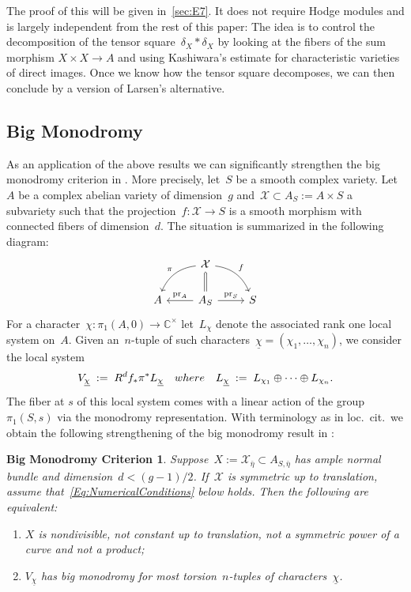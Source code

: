 \documentclass[a4paper]{amsart}
\newcommand{\bbC}{\mathbb{C}}
\newcommand{\cX}{\mathcal{X}}
\DeclareMathOperator{\pr}{pr}
\theoremstyle{plain}
\newtheorem*{bigmonodromyintro}{Big Monodromy Criterion}
\theoremstyle{definition}
\numberwithin{equation}{section}
\begin{document}
The proof of this will be given in~\cref{sec:E7}. It does not require Hodge modules and is largely independent from the rest of this paper: The idea is to control the decomposition of the tensor square~$\delta_X*\delta_X$ by looking at the fibers of the sum morphism $X\times X \to A$ and using Kashiwara's estimate for characteristic varieties of direct images. Once we know how the tensor square decomposes, we can then conclude by a version of Larsen's alternative.

\subsection{Big Monodromy} As an application of the above results we can significantly strengthen the big monodromy criterion in \cite{JKLM}. More precisely, let~$S$ be a smooth complex variety. Let~$A$ be a complex abelian variety of dimension~$g$ and~$\cX \subset A_S := A\times S$ a subvariety such that the projection~$f \colon \cX \to S$ is a smooth morphism with connected fibers of dimension~$d$.  The situation is summarized in the following diagram:
%
\[
\begin{tikzcd}
&  \cX \ar[d, hook, no head, xshift=-1pt] \ar[d, no head, shorten <=1.2pt, xshift=1pt] \ar[dl, bend right=30, swap, "\pi"] \ar[dr, bend left=30, "f"]  & \\
A & A_S \ar[l, swap, "\pr_A"] \ar[r, "\pr_S"]  & S
\end{tikzcd}
\]
% 
For a character~$\chi \colon \pi_1(A, 0) \to \bbC^\times$ let~$L_\chi$ denote the associated rank one local system on~$A$. Given an~$n$-tuple of such characters~$\underline{\chi} = (\chi_1, \dots, \chi_n)$, we consider the local system
\[ V_{\underline{\chi}} \;:=\; R^d f_{\ast} \pi^* L_{\underline{\chi}} \quad \textup{where} \quad L_{\underline{\chi}} \;:=\; L_{\chi_1} \oplus \cdots \oplus L_{\chi_n}.\]
The fiber at $s$ of this local system comes with a linear action of the group~$\pi_1(S,s)$ via the monodromy representation. With terminology as in loc.~cit.~we  obtain the following strengthening of the big monodromy result in \cite[sect. 1.1]{JKLM}:

\begin{bigmonodromyintro} Suppose~$X:= \cX_{\bar{\eta}} \subset A_{S, \bar{\eta}}$ has ample normal bundle and dimension~$d < (g-1)/2$. If~$\cX$ is symmetric up to translation, assume that~\eqref{Eq:NumericalConditions} below holds. Then the following are equivalent:
\begin{enumerate}
\item $X$ is nondivisible, not constant up to translation, not a symmetric power of a curve and not a product; \smallskip
\item $V_{\underline{\chi}}$ has big monodromy for most 
torsion~$n$-tuples of characters~$\underline{\chi}$.
\end{enumerate}
\end{bigmonodromyintro}
\end{document}
